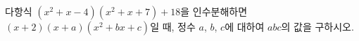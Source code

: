 다항식 $(x^2+x-4)(x^2+x+7)+18$을 인수분해하면 $(x+2)(x+a)(x^2+bx+c)$일 때, 정수 $a$, $b$, $c$에 대하여 $abc$의 값을 구하시오.
